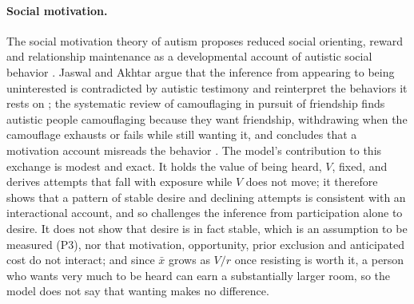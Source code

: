 \paragraph{Social motivation.} The social motivation theory of autism proposes reduced social orienting, reward and relationship maintenance as a developmental account of autistic social behavior \cite{Chevallier2012}. Jaswal and Akhtar argue that the inference from appearing to being uninterested is contradicted by autistic testimony and reinterpret the behaviors it rests on \cite{Jaswal2019}; the systematic review of camouflaging in pursuit of friendship finds autistic people camouflaging because they want friendship, withdrawing when the camouflage exhausts or fails while still wanting it, and concludes that a motivation account misreads the behavior \cite{Ridgway2025}. The model's contribution to this exchange is modest and exact. It holds the value of being heard, $V$, fixed, and derives attempts that fall with exposure while $V$ does not move; it therefore shows that a pattern of stable desire and declining attempts is consistent with an interactional account, and so challenges the inference from participation alone to desire. It does not show that desire is in fact stable, which is an assumption to be measured (P3), nor that motivation, opportunity, prior exclusion and anticipated cost do not interact; and since $\bar{x}$ grows as $V/r$ once resisting is worth it, a person who wants very much to be heard can earn a substantially larger room, so the model does not say that wanting makes no difference.

